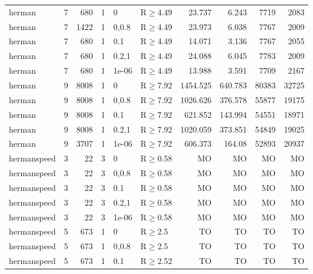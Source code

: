 \begin{longtable}{llrrllrrrr}
 herman        & 7        &    	680 &   1 & 0     & R$\geq$4.49  & 23.737   & 6.243    & 7719    & 2083   \\
 herman        & 7        &   	1422 &   1 & 0,0.8 & R$\geq$4.49  & 23.973   & 6.038    & 7767    & 2009   \\
 herman        & 7        &    	680 &   1 & 0.1   & R$\geq$4.49  & 14.071   & 3.136    & 7767    & 2055   \\
 herman        & 7        &    	680 &   1 & 0.2,1 & R$\geq$4.49  & 24.088   & 6.045    & 7783    & 2009   \\
 herman        & 7        &    	680 &   1 & 1e-06 & R$\geq$4.49  & 13.988   & 3.591    & 7709    & 2167   \\
 herman        & 9        &   	8008 &   1 & 0     & R$\geq$7.92  & 1454.525 & 640.783  & 80383   & 32725  \\
 herman        & 9        &   	8008 &   1 & 0,0.8 & R$\geq$7.92  & 1026.626 & 376.578  & 55877   & 19175  \\
 herman        & 9        &   	8008 &   1 & 0.1   & R$\geq$7.92  & 621.852  & 143.994  & 54551   & 18971  \\
 herman        & 9        &   	8008 &   1 & 0.2,1 & R$\geq$7.92  & 1020.059 & 373.851  & 54849   & 19025  \\
 herman        & 9        &   	3707 &   1 & 1e-06 & R$\geq$7.92  & 606.373  & 164.08   & 52893   & 20937  \\
 hermanspeed   & 3        &     	22 &   3 & 0     & R$\geq$0.58  & MO       & MO       & MO      & MO     \\
 hermanspeed   & 3        &     	22 &   3 & 0,0.8 & R$\geq$0.58  & MO       & MO       & MO      & MO     \\
 hermanspeed   & 3        &     	22 &   3 & 0.1   & R$\geq$0.58  & MO       & MO       & MO      & MO     \\
 hermanspeed   & 3        &     	22 &   3 & 0.2,1 & R$\geq$0.58  & MO       & MO       & MO      & MO     \\
 hermanspeed   & 3        &     	22 &   3 & 1e-06 & R$\geq$0.58  & MO       & MO       & MO      & MO     \\
 hermanspeed   & 5        &    	673 &   1 & 0     & R$\geq$2.5   & TO       & TO       & TO      & TO     \\
 hermanspeed   & 5        &    	673 &   1 & 0,0.8 & R$\geq$2.5   & TO       & TO       & TO      & TO     \\
 hermanspeed   & 5        &    	673 &   1 & 0.1   & R$\geq$2.52  & TO       & TO       & TO      & TO     \\

\end{longtable}
